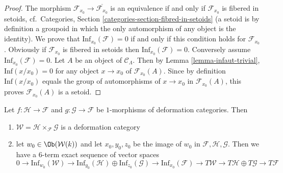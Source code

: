 \begin{proof}
The morphism $\mathcal{F}_{x_0} \to \overline{\mathcal{F}_{x_0}}$ is an
equivalence if and only if $\mathcal{F}_{x_0}$ is fibered in setoids,
cf.\ Categories, Section \ref{categories-section-fibred-in-setoids}
(a setoid is by definition a groupoid in
which the only automorphism of any object is the identity). We prove that
$\text{Inf}_{x_0}(\mathcal{F}) = 0$ if and only if this condition holds
for $\mathcal{F}_{x_0}$.  Obviously if $\mathcal{F}_{x_0}$ is fibered in
setoids then $\text{Inf}_{x_0}(\mathcal{F}) = 0$.  Conversely assume
$\text{Inf}_{x_0}(\mathcal{F}) = 0$.  Let $A$ be an object of
$\mathcal{C}_\Lambda$. Then by
Lemma \ref{lemma-infaut-trivial},
$\text{Inf}(x/x_0) = 0$ for any object $x \to x_0$ of
$\mathcal{F}_{x_0}(A)$. Since by definition $\text{Inf}(x/x_0)$
equals the group of automorphisms of $x \to x_0$ in $\mathcal{F}_{x_0}(A)$,
this proves $\mathcal{F}_{x_0}(A)$ is a setoid.
\end{proof}

\begin{lemma}
\label{lemma-deformation-categories-fiber-product-morphisms}
Let $f : \mathcal{H} \to \mathcal{F}$ and $g : \mathcal{G} \to \mathcal{F}$
be $1$-morphisms of deformation categories. Then
\begin{enumerate}
\item $\mathcal{W} = \mathcal{H} \times_\mathcal{F} \mathcal{G}$ is a
deformation category
\item let $w_0 \in \Ob(\mathcal{W}(k))$ and let $x_0, y_0, z_0$ be
the image of $w_0$ in $\mathcal{F}, \mathcal{H}, \mathcal{G}$. Then
we have a $6$-term exact sequence of vector spaces
$$
0 \to \text{Inf}_{w_0}(\mathcal{W})
\to \text{Inf}_{y_0}(\mathcal{H}) \oplus \text{Inf}_{z_0}(\mathcal{G})
\to \text{Inf}_{x_0}(\mathcal{F}) \to
T\mathcal{W} \to T\mathcal{H} \oplus T\mathcal{G} \to T\mathcal{F}
$$
\end{enumerate}
\end{lemma}

